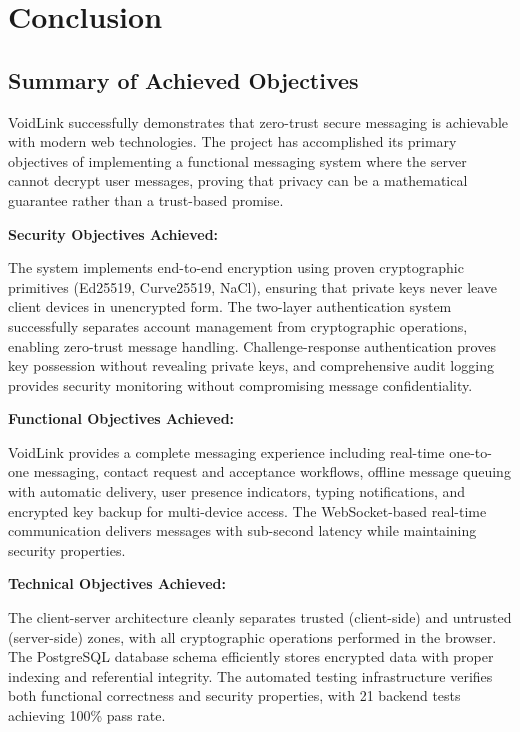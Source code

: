 \chapter*{Conclusion}

\section*{Summary of Achieved Objectives}

VoidLink successfully demonstrates that zero-trust secure messaging is achievable with modern web technologies. The project has accomplished its primary objectives of implementing a functional messaging system where the server cannot decrypt user messages, proving that privacy can be a mathematical guarantee rather than a trust-based promise.

\textbf{Security Objectives Achieved:}

The system implements end-to-end encryption using proven cryptographic primitives (Ed25519, Curve25519, NaCl), ensuring that private keys never leave client devices in unencrypted form. The two-layer authentication system successfully separates account management from cryptographic operations, enabling zero-trust message handling. Challenge-response authentication proves key possession without revealing private keys, and comprehensive audit logging provides security monitoring without compromising message confidentiality.

\textbf{Functional Objectives Achieved:}

VoidLink provides a complete messaging experience including real-time one-to-one messaging, contact request and acceptance workflows, offline message queuing with automatic delivery, user presence indicators, typing notifications, and encrypted key backup for multi-device access. The WebSocket-based real-time communication delivers messages with sub-second latency while maintaining security properties.

\textbf{Technical Objectives Achieved:}

The client-server architecture cleanly separates trusted (client-side) and untrusted (server-side) zones, with all cryptographic operations performed in the browser. The PostgreSQL database schema efficiently stores encrypted data with proper indexing and referential integrity. The automated testing infrastructure verifies both functional correctness and security properties, with 21 backend tests achieving 100\% pass rate.

